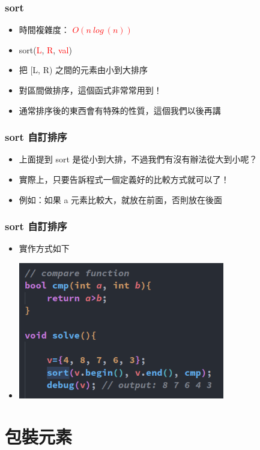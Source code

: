 \documentclass[mathserif]{beamer}
\begin{document}
\begin{frame}
    \frametitle{sort}
    \begin{itemize}
        \item 時間複雜度： \textcolor{red}{\textbf{$O(n\ log\ (n))$}}
        \item sort(\textcolor{red}{L}, \textcolor{red}{R}, \textcolor{red}{val})
        \item 把 [L, R) 之間的元素由小到大排序
        \vspace{0.5cm}
        \item 對區間做排序，這個函式非常常用到！
        \item 通常排序後的東西會有特殊的性質，這個我們以後再講
    \end{itemize}
\end{frame}

\begin{frame}
    \frametitle{sort 自訂排序}
    \begin{itemize}
        \item 上面提到 sort 是從小到大排，不過我們有沒有辦法從大到小呢？
        \item 實際上，只要告訴程式一個定義好的比較方式就可以了！
        \item 例如：如果 a 元素比較大，就放在前面，否則放在後面
    \end{itemize}
\end{frame}

\begin{frame}
    \frametitle{sort 自訂排序}
    \begin{itemize}
        \item 實作方式如下
        \item \includegraphics[width=9.0cm]{img/4-1.png}
    \end{itemize}
\end{frame}

\section{包裝元素}
\end{document}
